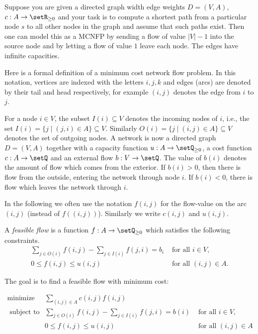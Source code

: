 \begin{example}
  Suppose you are given a directed graph width edge weights $D =
  (V,A)$,  $c: A \to \setR_{\geq0}$ and your task is to compute a shortest path
  from a particular node $s$ to all other nodes in the graph and
  assume that such paths exist. Then one can model this as a MCNFP by
  sending a flow of value $|V|-1$ into the source node and by letting
  a flow of value $1$ leave each node. The edges have infinite
  capacities. 
\end{example}




Here is a formal definition of a minimum cost network flow problem. In
this notation, vertices are indexed with the letters $i,j,k$ and edges
(arcs)  are denoted by their tail and head respectively, for example
$(i,j)$ denotes the edge from $i$ to $j$. 
  
For a node $i\in V$, the subset $I(i)\subseteq V$ denotes the incoming nodes of
$i$, i.e., the set $I(i) = \{ j \mid (j,i) \in A\}\subseteq V$. Similarly $O(i) = \{ j
\mid (i,j) \in A\}\subseteq V$ denotes the set of outgoing nodes. A network is now a
directed graph $D = (V,A)$ together with a capacity function $u: A \to
\setQ_{\geq0}$, a cost function $c: A \to\setQ$ and an external flow $b: V \to \setQ$.
The value of $b(i)$ denotes the amount of flow which comes from the
exterior. If $b(i)>0$, then there is flow from the outside, entering
the network through node $i$. If $b(i)<0$, there is flow which leaves
the network through $i$.

In the following we often use the notation $f(i,j)$ for the flow-value
on the arc $(i,j)$ (instead of $f((i,j))$). Similarly we write
$c(i,j)$ and $u(i,j)$. 

A \emph{feasible flow} is a function $f:A \to \setQ_{\geq0}$ which
satisfies the following constraints. 
\begin{displaymath}  
  \begin{array}{cl}
    \sum_{j \in O(i)} f{(i,j)} - \sum_{j\in I(i)} f{(j,i)} =b_i & \text{ for all } i \in V,\\
    0 \leq f{(i,j)} \leq u{(i,j)}              & \text{ for all } (i,j) \in A.
  \end{array}
\end{displaymath}


The goal is to find a feasible flow with minimum cost: 


  \begin{displaymath}
    \begin{array}{rcl}
      \text{minimize}     & \sum_{(i,j) \in A} c(i,j) f(i,j) &     \\
      \text{ subject to}  & \sum_{j \in O(i)} f(i,j) - \sum_{j\in I(i)} f(j,i) =b(i) & \text{ for all } i \in V,\\
                          & 0 \leq f(i,j) \leq u(i,j)              &
                          \text{ for all } (i,j) \in A 
    \end{array}
  \end{displaymath}
  
